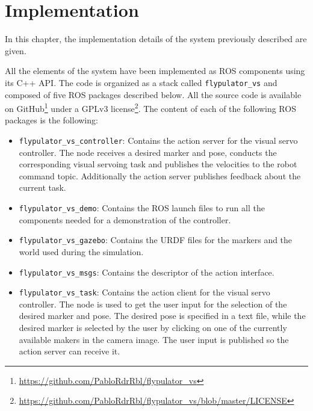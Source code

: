 
\chapter{Implementation}
\label{chap:implementation}

In this chapter, the implementation details of the system previously described are given.

All the elements of the system have been implemented as ROS components using its C++ API. The code is organized as a stack called \texttt{flypulator\_vs} and composed of five ROS packages described below. All the source code is available on GitHub\footnote{\url{https://github.com/PabloRdrRbl/flypulator_vs}} under a GPLv3 license\footnote{\url{https://github.com/PabloRdrRbl/flypulator_vs/blob/master/LICENSE}}. The content of each of the following ROS packages is the following:


\begin{itemize}
	\item \texttt{flypulator\_vs\_controller}: Contains the action server for the visual servo controller. The node receives a desired marker and pose, conducts the corresponding visual servoing task and publishes the velocities to the robot command topic. Additionally the action server publishes feedback about the current task.
	
	\item \texttt{flypulator\_vs\_demo}: Contains the ROS launch files to run all the components needed for a demonstration of the controller.
	
	\item \texttt{flypulator\_vs\_gazebo}: Contains the URDF files for the markers and the world used during the simulation.
	
	\item \texttt{flypulator\_vs\_msgs}: Contains the descriptor of the action interface.
	
	\item \texttt{flypulator\_vs\_task}: Contains the action client for the visual servo controller. The node is used to get the user input for the selection of the desired marker and pose. The desired pose is specified in a text file, while the desired marker is selected by the user by clicking on one of the currently available makers in the camera image. The user input is published so the action server can receive it.
\end{itemize}

